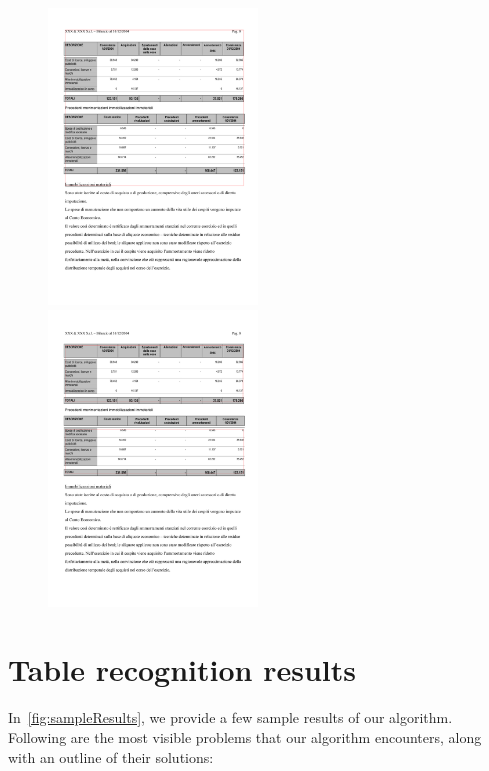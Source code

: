 \begin{figure}[t]
\centering

\includegraphics[width=15em]{img/results/tableFind2Tess.jpg}
\includegraphics[width=15em]{img/results/tableFind2Us.png}

\caption{}
\label{fig:tableFindComparison_Ours}
\end{figure}

\section{Table recognition results}

In~\cref{fig:sampleResults}, we provide a few sample results of our algorithm. Following are the most visible problems that our algorithm encounters, along with an outline of their solutions:

